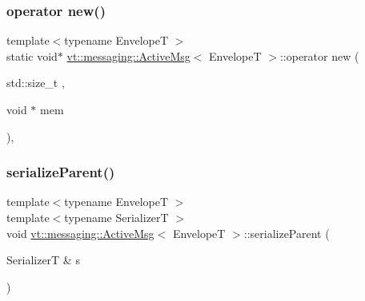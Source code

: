 \mbox{\label{structvt_1_1messaging_1_1_active_msg_a03927a2881ef7e3308765361cb89c606}} 
\subsubsection{\texorpdfstring{operator new()}{operator new()}\hspace{0.1cm}{\footnotesize\ttfamily [3/3]}}
{\footnotesize\ttfamily template$<$typename EnvelopeT $>$ \\
static void$\ast$ \hyperlink{structvt_1_1messaging_1_1_active_msg}{vt\+::messaging\+::\+Active\+Msg}$<$ EnvelopeT $>$\+::operator new (\begin{DoxyParamCaption}\item[{std\+::size\+\_\+t}]{,  }\item[{void $\ast$}]{mem }\end{DoxyParamCaption})\hspace{0.3cm}{\ttfamily [inline]}, {\ttfamily [static]}}

\mbox{\label{structvt_1_1messaging_1_1_active_msg_af2e3461bf33d85487cdadc5d20f6ecf8}} 
\subsubsection{\texorpdfstring{serialize\+Parent()}{serializeParent()}}
{\footnotesize\ttfamily template$<$typename EnvelopeT $>$ \\
template$<$typename SerializerT $>$ \\
void \hyperlink{structvt_1_1messaging_1_1_active_msg}{vt\+::messaging\+::\+Active\+Msg}$<$ EnvelopeT $>$\+::serialize\+Parent (\begin{DoxyParamCaption}\item[{SerializerT \&}]{s }\end{DoxyParamCaption})\hspace{0.3cm}{\ttfamily [inline]}}



